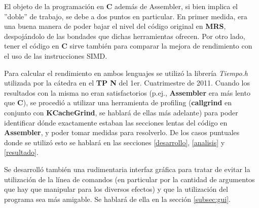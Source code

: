 El objeto de la programación en \textbf{C} además de Assembler, si bien implica el ''doble'' de trabajo, se debe a dos puntos en particular. En primer medida, era una buena manera de poder bajar el nivel del código original en \textbf{MRS}, despojándolo de las bondades que dichas herramientas ofrecen. Por otro lado, tener el código en \textbf{C} sirve también para comparar la mejora de rendimiento con el uso de las instrucciones SIMD. \vspace{\baselineskip}

Para calcular el rendimiento en ambos lenguajes se utilizó la librería \textit{Tiempo.h} utilizada por la cátedra en el \textbf{TP N} del 1er. Cuatrimestre de 2011. Cuando los resultados con la misma no eran satisfactorios (p.ej., \textbf{Assembler} era más lento que \textbf{C}), se procedió a utilizar una herramienta de profiling (\textbf{callgrind} en conjunto con \textbf{KCacheGrind}, se hablará de ellas más adelante) para poder identificar dónde exactamente estaban las secciones lentas del código en \textbf{Assembler}, y poder tomar medidas para resolverlo. De los casos puntuales donde se utilizó esto se hablará en las secciones \ref{desarrollo}, \ref{analisis} y \ref{resultado}.\vspace{\baselineskip}

Se desarrolló también una rudimentaria interfaz gráfica para tratar de evitar la utilización de la línea de comandos (en particular por la cantidad de argumentos que hay que manipular para los diversos efectos) y que la utilización del programa sea más amigable. Se hablará de ella en la sección \ref{subsec:gui}.
 
